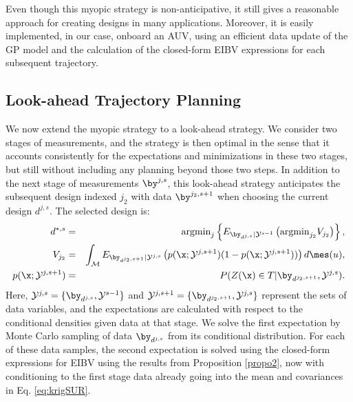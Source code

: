 Even though this myopic strategy is non-anticipative, it still gives a
reasonable approach for creating designs in many
applications. Moreover, it is easily implemented, in our case, onboard
an AUV, using an efficient data update of the GP model and the
calculation of the closed-form EIBV expressions for each subsequent
trajectory.


\subsection{Look-ahead Trajectory Planning}
\label{sec:LA}

We now extend the myopic strategy to a look-ahead strategy. We consider two stages of
measurements, and the strategy is then optimal in the sense that it accounts consistently for the expectations and minimizations in these two stages, but still without including any planning beyond those two steps. In addition to the
next stage of measurements $\by^{j,s}$, this look-ahead strategy anticipates the subsequent design indexed $j_2$ with data
$\by^{j_2,s+1}$ when choosing the current design $d^{j,s}$. The
selected design is:
\begin{eqnarray}\label{critLA}
    d^{*,s} &=& \mbox{argmin}_{j} \left\{ E_{\by_{d^{j,s}}|\mathcal{Y}^{s-1}} \left( \mbox{argmin}_{j_2}  V_{j_2} \right) \right\}, \\
V_{j_2} & = & \int_{\mathcal{M}} E_{\by_{d^{j_2,s+1}}|\mathcal{Y}^{j,s}} \left( p(\x;\mathcal{Y}^{j,s+1}) ( 1-p(\x;\mathcal{Y}^{j,s+1}) ) \right) d\mes(u), \nonumber \\
    p(\x;\mathcal{Y}^{j,s+1}) &=& P(Z(\x) \in T |\by_{d^{j_2,s+1}},\mathcal{Y}^{j,s}). \nonumber
\end{eqnarray}
Here, $\mathcal{Y}^{j,s}=\{\by_{d^{j,s}},\mathcal{Y}^{s-1}\}$ and
$\mathcal{Y}^{j,s+1}=\{\by_{d^{j_2,s+1}},\mathcal{Y}^{j,s}\}$
represent the sets of data variables, and the expectations are
calculated with respect to the conditional densities given data at
that stage.  We solve the first expectation by Monte
Carlo sampling of data $\by_{d^{j,s}}$ from its conditional
distribution. For each of these data samples, the second expectation
is solved using the closed-form expressions for EIBV using the results from Proposition \ref{propo2}, now with conditioning to the first stage data already going into the mean and covariances in Eq. \eqref{eq:krigSUR}. 

